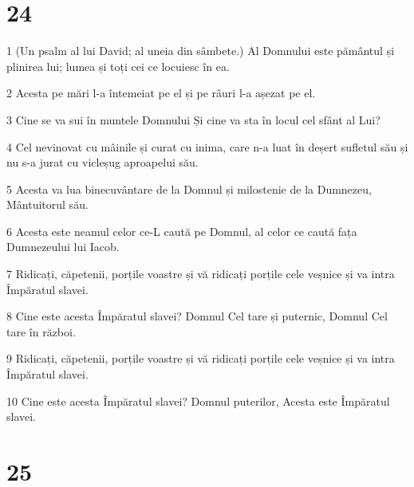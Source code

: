 \chapter{24}

\par 1 (Un psalm al lui David; al uneia din sâmbete.) Al Domnului este pământul și plinirea lui; lumea și toți cei ce locuiesc în ea.
\par 2 Acesta pe mări l-a întemeiat pe el și pe râuri l-a așezat pe el.
\par 3 Cine se va sui în muntele Domnului Și cine va sta în locul cel sfânt al Lui?
\par 4 Cel nevinovat cu mâinile și curat cu inima, care n-a luat în deșert sufletul său și nu s-a jurat cu vicleșug aproapelui său.
\par 5 Acesta va lua binecuvântare de la Domnul și milostenie de la Dumnezeu, Mântuitorul său.
\par 6 Acesta este neamul celor ce-L caută pe Domnul, al celor ce caută fața Dumnezeului lui Iacob.
\par 7 Ridicați, căpetenii, porțile voastre și vă ridicați porțile cele veșnice și va intra Împăratul slavei.
\par 8 Cine este acesta Împăratul slavei? Domnul Cel tare și puternic, Domnul Cel tare în război.
\par 9 Ridicați, căpetenii, porțile voastre și vă ridicați porțile cele veșnice și va intra Împăratul slavei.
\par 10 Cine este acesta Împăratul slavei? Domnul puterilor, Acesta este Împăratul slavei.

\chapter{25}

